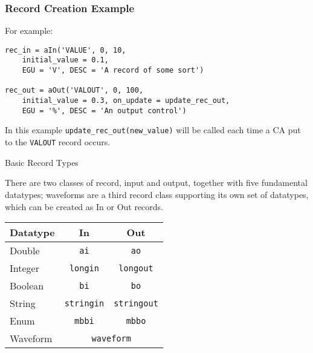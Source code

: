 \documentclass{beamer}
\begin{document}
%
\begin{frame}[fragile]\frametitle{Record Creation Example}

For example:

\lstset{language=Python}
\begin{lstlisting}
rec_in = aIn('VALUE', 0, 10,
    initial_value = 0.1,
    EGU = 'V', DESC = 'A record of some sort')

rec_out = aOut('VALOUT', 0, 100,
    initial_value = 0.3, on_update = update_rec_out,
    EGU = '%', DESC = 'An output control')
\end{lstlisting}

In this example \texttt{update\_rec\_out(new\_value)} will be called each time a
CA put to the \texttt{VALOUT} record occurs.


\end{frame}


%
\begin{frame}{Basic Record Types}

There are two classes of record, input and output, together with five
fundamental datatypes; waveforms are a third record class supporting its
own set of datatypes, which can be created as In or Out records.

\medskip

\begin{center}
\begin{tabular}{l|c|c|}
Datatype & In & Out \\
\hline
Double & \texttt{ai} & \texttt{ao} \\
Integer & \texttt{longin} & \texttt{longout} \\
Boolean & \texttt{bi} & \texttt{bo} \\
String & \texttt{stringin} & \texttt{stringout} \\
Enum & \texttt{mbbi} & \texttt{mbbo} \\
Waveform & \multicolumn{2}{c|}{\texttt{waveform}} \\
\hline
\end{tabular}
\end{center}

\end{frame}
\end{document}
